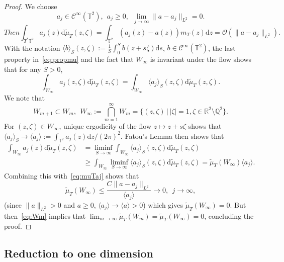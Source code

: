 \documentclass[10pt]{amsart}
\theoremstyle{definition}\newtheorem{defi}[theo]{Definition}\newtheorem{rema}[theo]{Remark}\newtheorem{exam}[theo]{Example}\newtheorem{exem}[theo]{Example}\newtheorem{nota}[theo]{Notation}
\newcommand{\CI}{{\mathcal C}^\infty }
\newcommand{\R}{{\mathbb R}}
\newcommand{\TT}{{\mathbb T}}
\newcommand*{\dd}{\mathrm{d}}
\newcommand*{\dz}{\dd z}
\newcommand*{\ds}{\dd s}
\newcommand*{\dwmu}{\dd \widetilde\mu}
\newcommand*{\tq}{\,|\,}
\begin{document}
\begin{proof}
We choose
\begin{equation}\label{eq:aj}
a_j \in \CI (\TT^2), \ \ a_j \geq 0, \ \
\lim_{ j \to \infty } \| a - a_j\|_{L^2 } = 0.
\end{equation}
\begin{equation}
Then\label{eq:muTaj}
\int_{T^* \TT^2 } a_j (z) \dwmu_T (z,\zeta) = \int_{ \TT^2 } (a_j (z) - a (z)) m_T (z) \dz = \mathcal O (\| a - a_j \|_{L^2 }).
\end{equation}
With the notation $ \langle b \rangle_S (z, \zeta) := \frac{1}{S} \int_{ 0}^S b (z + s \zeta) \ds $, $ b \in \CI (\TT^2) $, the last property in~\eqref{eq:propmu} and the fact that $ W_\infty $ is invariant under the flow shows that for any $ S > 0 $,
\[
\int_{W_\infty } a_j (z,\zeta) \dwmu_T (z,\zeta) =
\int_{W_\infty } \langle a_j \rangle_S (z, \zeta) \dwmu_T (z,\zeta).
\]
We note that
\begin{equation}\label{eq:Wm}
W_{m+1} \subset W_m, \ \ W_\infty := \bigcap_{ m =1}^\infty W_m = \{(z, \zeta) \tq |\zeta|=1,
\zeta \in \R^2 \setminus \mathbb Q^2 \}.
\end{equation}
For $ (z, \zeta) \in W_\infty $, unique ergodicity of the flow $ z \mapsto z + s \zeta $ shows that $ \langle a_j \rangle_S \to \langle a_j
\rangle := \int_{\TT^2} a_j (z) \dz / (2 \pi)^2. $ Fatou's Lemma then shows that
\[
\begin{split} \int_{W_\infty } a_j (z) \dwmu_T (z,\zeta)
& = \liminf_{ S \to \infty } \int_{W_\infty } \langle a_j \rangle_S (z, \zeta) \dwmu_T (z,\zeta) \\
& \geq \int_{W_\infty} \liminf_{ S \to \infty } \langle a_j \rangle_S (z, \zeta) \dwmu_T (z,\zeta) = \widetilde \mu_T (W_\infty) \langle a_j \rangle.
\end{split}
\]
Combining this with~\eqref{eq:muTaj} shows that
\[
\widetilde \mu_T (W_\infty) \leq \frac{ C \| a - a_j \|_{L^2 } } {\langle a_j \rangle} \rightarrow 0, \ \ j \to \infty,
\]
(since $ \| a \|_{L^2 } > 0 $ and $ a \geq 0 $, $ \langle a_j \rangle
\to \langle a \rangle > 0 $) which gives $ \widetilde \mu_T (W_\infty) = 0 $. But then~\eqref{eq:Wm} implies that $ \lim_{ m \to \infty } \widetilde \mu_T (W_m) = \widetilde \mu_T (W_\infty) = 0 $, concluding the proof.
\end{proof}

\subsection{Reduction to one dimension}
\end{document}
